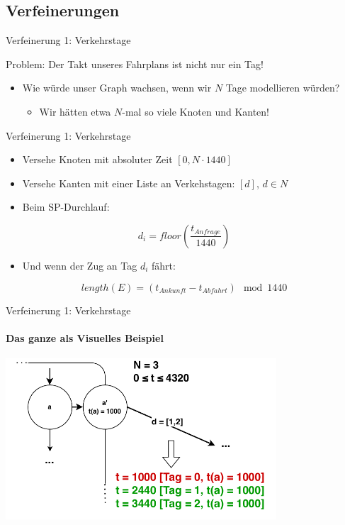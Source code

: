 \subsection{Verfeinerungen}
\begin{frame}{Verfeinerung 1: Verkehrstage}
	\begin{block}{}
		Problem: Der Takt unseres Fahrplans ist nicht nur ein Tag!
	\end{block}

	\begin{itemize}
		\item Wie würde unser Graph wachsen, wenn wir $N$ Tage modellieren würden?
		\begin{itemize}
			\item Wir hätten etwa $N$-mal so viele Knoten und Kanten!
		\end{itemize}
	\end{itemize}

\end{frame}


\begin{frame}{Verfeinerung 1: Verkehrstage}
	\begin{itemize}
		\item Versehe Knoten mit absoluter Zeit $[0,N \cdot 1440]$
		\item Versehe Kanten mit einer Liste an Verkehstagen: $[d]$, $d \in N$
		\item Beim SP-Durchlauf:
	\end{itemize}

	\begin{equation*}
		d_i = floor(\frac{t_{Anfrage}}{1440})
	\end{equation*}

	\begin{itemize}
		\item Und wenn der Zug an Tag $d_i$ fährt:
	\end{itemize}

	\begin{equation*}
		length(E) = (t_{Ankunft} - t_{Abfahrt}) \mod 1440
	\end{equation*}
\end{frame}


\begin{frame}{Verfeinerung 1: Verkehrstage}
\framesubtitle{Das ganze als Visuelles Beispiel}
	\begin{center}
		\includegraphics[height=6cm]{images/time-expanded/verkehrstage-beispiel.pdf} 
	\end{center}
\end{frame}


